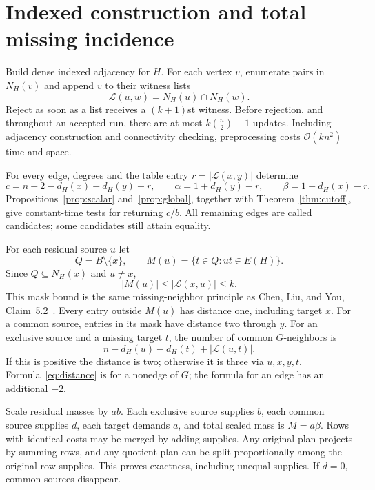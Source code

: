 \documentclass[11pt]{article}
\theoremstyle{remark}
\newcommand{\Oh}{\mathcal O}
\newcommand{\NH}{N_H}
\begin{document}
\section{Indexed construction and total missing incidence}\label{sec:construction}

Build dense indexed adjacency for $H$. For each vertex $v$, enumerate pairs in $\NH(v)$ and append $v$ to their witness lists
\[
 \mathcal L(u,w)=\NH(u)\cap\NH(w).
\]
Reject as soon as a list receives a $(k+1)$st witness. Before rejection, and throughout an accepted run, there are at most $k\binom n2+1$ updates. Including adjacency construction and connectivity checking, preprocessing costs $\Oh(kn^2)$ time and space.

For every edge, degrees and the table entry $r=|\mathcal L(x,y)|$ determine
\[
 c=n-2-d_H(x)-d_H(y)+r,\qquad
 \alpha=1+d_H(y)-r,\qquad\beta=1+d_H(x)-r.
\]
Propositions~\ref{prop:scalar} and~\ref{prop:global}, together with Theorem~\ref{thm:cutoff}, give constant-time tests for returning $c/b$. All remaining edges are called candidates; some candidates still attain equality.

For each residual source $u$ let
\[
 Q=B\setminus\{x\},\qquad
 M(u)=\{t\in Q:ut\in E(H)\}.
\]
Since $Q\subseteq\NH(x)$ and $u\ne x$,
\begin{equation}\label{eq:masksize}
 |M(u)|\le|\mathcal L(x,u)|\le k.
\end{equation}
This mask bound is the same missing-neighbor principle as Chen, Liu, and You, Claim~5.2~\cite{chen}. Every entry outside $M(u)$ has distance one, including target $x$. For a common source, entries in its mask have distance two through $y$. For an exclusive source and a missing target $t$, the number of common $G$-neighbors is
\begin{equation}\label{eq:distance}
 n-d_H(u)-d_H(t)+|\mathcal L(u,t)|.
\end{equation}
If this is positive the distance is two; otherwise it is three via $u,x,y,t$. Formula~\eqref{eq:distance} is for a nonedge of $G$; the formula for an edge has an additional $-2$.

Scale residual masses by $ab$. Each exclusive source supplies $b$, each common source supplies $d$, each target demands $a$, and total scaled mass is $M=a\beta$. Rows with identical costs may be merged by adding supplies. Any original plan projects by summing rows, and any quotient plan can be split proportionally among the original row supplies. This proves exactness, including unequal supplies. If $d=0$, common sources disappear.
\end{document}

